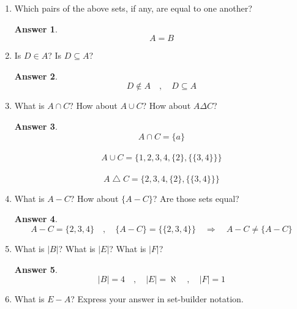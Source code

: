 \documentclass{article}
\renewcommand{\(}{\left(}
\renewcommand{\)}{\right)}
\theoremstyle{plain}
\theoremstyle{plain}
\theoremstyle{definition}
\newtheorem*{answer}{Answer}
\begin{document}
\begin{enumerate}[label*=\roman*.,ref=\roman*]

\item Which pairs of the above sets, if any, are equal to one another?

\begin{shaded}
\begin{answer}
$$ A = B $$
\end{answer}
\end{shaded}

\item Is $D \in A$? Is $D \subseteq A$?

\begin{shaded}
\begin{answer}
$$ D \not\in A   \quad , \quad  D \subseteq A $$
\end{answer}
\end{shaded}

\item What is $A \cap C$? How about $A \cup C$? How about $A \Delta C$?

\begin{shaded}
\begin{answer}
 $$ A\cap C = \{a\}$$    \\
 $$ A \cup C = \{ 1,2,3,4,\{2\},\{\{3,4\}\}\} $$ \\
$$ A \bigtriangleup C = \{2,3,4,\{2\},\{\{3,4\}\}\} $$
\end{answer}
\end{shaded}

\item What is $A - C$? How about $\{A - C\}$? Are those sets equal?

\begin{shaded}
\begin{answer}
 $$ A - C = \{2,3,4\} \quad , \quad \{A-C\} = \{\{2,3,4\}\} \quad \Rightarrow \quad A-C \neq \{A-C\} $$
\end{answer}
\end{shaded}

\item What is $|B|$? What is $|E|$? What is $|F|$?

\begin{shaded}
\begin{answer}
$$ | B | = 4 \quad , \quad | E | = \aleph \quad , \quad | F | = 1 $$
\end{answer}
\end{shaded}

\item What is $E - A$? Express your answer in set-builder notation.


\end{enumerate}
\end{document}
